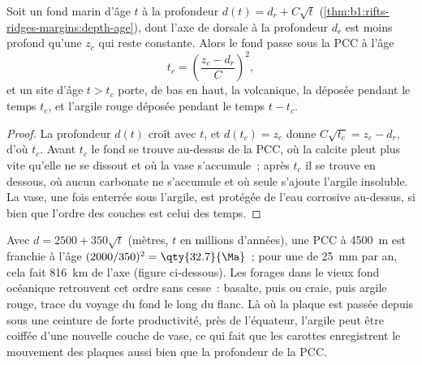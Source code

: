 \begin{proposition}\label{prop:b1:chemical-biogenic-sediments:flank}
Soit un fond marin d'âge $t$ à la profondeur $d(t) = d_r + C\sqrt t$
(\cref{thm:b1:rifts-ridges-margins:depth-age}), dont l'axe de dorsale à la profondeur $d_r$
est moins profond qu'une  $z_c$ qui reste constante. Alors
le fond passe sous la PCC à l'âge
\[
t_c = \left(\frac{z_c - d_r}{C}\right)^2 ,
\]
et un site d'âge $t > t_c$ porte, de bas en haut, la  volcanique,
la  déposée pendant le temps $t_c$, et l'argile rouge déposée pendant
le temps $t - t_c$.
\end{proposition}

\begin{proof}
La profondeur $d(t)$ croît avec $t$, et $d(t_c) = z_c$ donne $C\sqrt{t_c} =
z_c - d_r$, d'où $t_c$. Avant $t_c$ le fond se trouve au-dessus de la PCC, où
la calcite pleut plus vite qu'elle ne se dissout et où la vase s'accumule~; après $t_c$ il
se trouve en dessous, où aucun carbonate ne s'accumule et où seule s'ajoute l'argile
insoluble. La vase, une fois enterrée sous l'argile, est protégée de l'eau corrosive
au-dessus, si bien que l'ordre des couches est celui des temps.
\end{proof}

Avec $d = 2500 + 350\sqrt t$ (mètres, $t$ en millions d'années), une PCC à
\qty{4500}{m} est franchie à l'âge $(2000/350)^2 = \qty{32.7}{\Ma}$~; pour une
 de \qty{25}{mm} par an, cela fait \qty{816}{km} de l'axe
(figure ci-dessous). Les forages dans le vieux fond océanique
retrouvent cet ordre sans cesse~: basalte, puis  ou craie,
puis argile rouge, trace du voyage du fond le long du flanc. Là où la plaque
est passée depuis sous une ceinture de forte productivité, près de l'équateur, l'argile
peut être coiffée d'une nouvelle couche de vase, ce qui fait que les carottes enregistrent le mouvement des
plaques aussi bien que la profondeur de la PCC.


